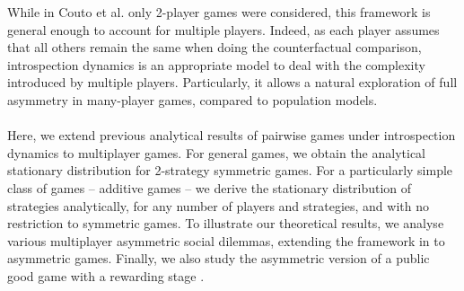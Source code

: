 \documentclass[11pt]{article}
\theoremstyle{plainCl1}
\theoremstyle{plainCl2}
\begin{document}
While in Couto et al. \cite{Couto:NJP:2022} only 2-player games were considered, this framework is general enough to account for multiple players. Indeed, as each player assumes that all others remain the same when doing the counterfactual comparison, introspection dynamics is an appropriate model to deal with the complexity introduced by multiple players. Particularly, it allows a natural exploration of full asymmetry in many-player games, compared to population models.
\\ \\
\noindent Here, we extend previous analytical results of pairwise games under introspection dynamics to multiplayer games. 
For general games, we obtain the analytical stationary distribution for 2-strategy symmetric games.
For a particularly simple class of games -- additive games -- we derive the stationary distribution of strategies analytically, for any number of players and strategies, and with no restriction to symmetric games. 
To illustrate our theoretical results, we analyse various multiplayer asymmetric social dilemmas, extending the framework in \cite{Hauert:JTB:2006a} to asymmetric games. Finally, we also study the asymmetric version of a public good game with a rewarding stage \cite{Pal:NatCom:2022}.
\end{document}
